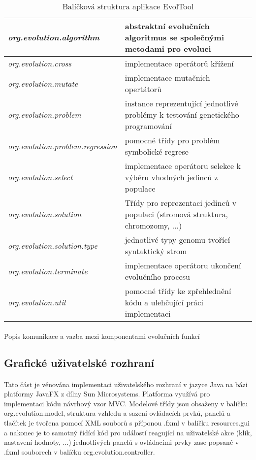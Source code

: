 \documentclass[bc,male,java,dept460]{diploma}		%
\begin{document}
\begin{table}
  \centering
  \begin{tabular}{| l | p{9cm} |} \hline
    \emph{org.evolution.algorithm} & abstraktní evolučních algoritmus se společnými metodami pro evoluci \\ \hline
    \emph{org.evolution.cross} & implementace operátorů křížení \\ \hline
    \emph{org.evolution.mutate} & implementace mutačnich opertátorů \\ \hline
    \emph{org.evolution.problem} & instance reprezentující jednotlivé problémy k testování genetického programování \\ \hline
    \emph{org.evolution.problem.regression} & pomocné třídy pro problém symbolické regrese  \\ \hline
    \emph{org.evolution.select} & implementace operátoru selekce k výběru vhodných jedinců z populace \\ \hline
    \emph{org.evolution.solution} & Třídy pro reprezentaci jedinců v populaci (stromová struktura, chromozomy, ...) \\ \hline
    \emph{org.evolution.solution.type} & jednotlivé typy genomu tvořící syntaktický strom \\ \hline
    \emph{org.evolution.terminate} & implementace operátoru ukončení evolučního procesu \\ \hline
    \emph{org.evolution.util} & pomocné třídy ke zpřehlednění kódu a ulehčující práci implementaci \\ \hline
  \end{tabular}
  \label{tab:packagetree}
  \caption{Balíčková struktura aplikace EvolTool}
\end{table}

\paragraph*{}
Popis komunikace a vazba mezi komponentami evolučních funkcí


\subsection{Grafické uživatelské rozhraní}
\paragraph*{}
Tato část je věnována implementaci uživatelského rozhraní v jazyce Java na bázi platformy JavaFX z dílny Sun Microsystems. Platforma využívá pro implementaci kódu návrhový vzor MVC. Modelové třídy jsou obsaženy v balíčku org.evolution.model, struktura vzhledu a sazeni ovládacích prvků, panelů a tlačítek je tvořena pomocí XML souborů s příponou .fxml v balíčku resources.gui a nakonec je to samotný řídící kód pro událostí reagující na uživatelské akce (klik, nastavení hodnoty, ...) jednotlivých panelů s ovládacími prvky zase popsané v .fxml souborech v balíčku org.evolution.controller. 
\end{document}

